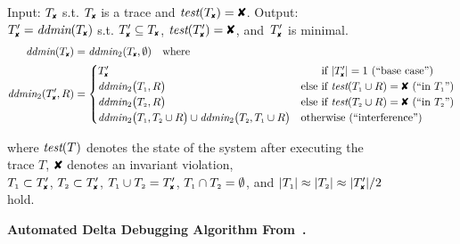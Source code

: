 \begin{figure}[t]
\footnotesize
\begin{boxedminipage}{\textwidth}
Input: $\cfail$ s.t. $\cfail$ is a trace and $\test(\cfail) = \DFAIL$. Output: $\dfail
= \ddmin(\cfail)$ s.t. $\dfail \subseteq
\cfail$, $\test(\dfail) = \DFAIL$, and~$\dfail$ is minimal.
\begin{align*}
\ddmin(\cfail) &= \ddmin_2(\cfail, \emptyset) \quad \text{where} \\
\ddmin_2(\dfail, R) &=
\begin{cases}
\dfail & \text{\hphantom{else }if $|\dfail| = 1$ (``base case'')} \\
\ddmin_2\bigl(\done, R\bigr) &
\text{else if $\test(\done \cup R) = \DFAIL$ (``in $\done$'')} \\
\ddmin_2\bigl(\dtwo, R\bigr) &
\text{else if $\test(\dtwo \cup R) = \DFAIL$ (``in $\dtwo$'')} \\
\ddmin_2\bigl(\done, \dtwo \cup R\bigr) \cup \ddmin_2\bigl(\dtwo, \done \cup
R\bigr) & \text{otherwise (``interference'')}
\end{cases}
\end{align*}
\begin{center}
where $\textit{test}(T)$ denotes the state of the system after executing the trace $T$,
$\DFAIL$ denotes an invariant violation, \\
$\done \subset \dfail$, $\dtwo \subset \dfail$, $\done \cup \dtwo = \dfail$, ${T_{\scriptscriptstyle 1}} \cap
{T_{\scriptscriptstyle 2}} = \emptyset$, and $|\done| \approx |\dtwo| \approx |\dfail| / 2$
hold.
\end{center}
\end{boxedminipage}
\caption{\textbf{Automated Delta Debugging Algorithm
From~\cite{Zeller:1999:YMP:318773.318946}.}}
\label{fig:ddmin}
\vspace{-0.3cm}
\end{figure}


